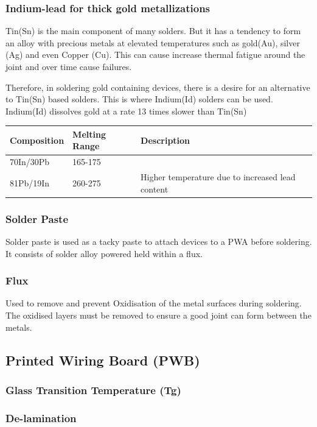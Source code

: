 \documentclass{article}
\begin{document}
		\subsubsection{Indium-lead for thick gold metallizations}
		Tin(Sn) is the main component of many solders.
		But it has a tendency to form an alloy with precious metals at elevated temperatures such as gold(Au), silver (Ag) and even Copper (Cu).
		This can cause increase thermal fatigue around the joint and over time cause failures.
		
		Therefore, in soldering gold containing devices, there is a desire for an alternative to Tin(Sn) based solders.
		This is where Indium(Id) solders can be used. Indium(Id) dissolves gold at a rate 13 times slower than Tin(Sn)
		
		\begin{center}
 			\begin{tabular}{| m{10em} | m{5em}| m{17em} |} 
 			\hline
 			\textbf{Composition} & \textbf{Melting Range} & \textbf{Description} \\ [0.5ex] 
 			\hline
 			 70In/30Pb & 165-175\degree &  \\ 
 			\hline
 			81Pb/19In & 260-275\degree & Higher temperature due to increased lead content \\ 
 			\hline
			\end{tabular}
		\end{center}	
		\subsubsection{Solder Paste}
		Solder paste is used as a tacky paste to attach devices to a PWA before soldering. 
		It consists of solder alloy powered held within a flux.
		\subsubsection{Flux}
		Used to remove and prevent Oxidisation of the metal surfaces during soldering. 
		The oxidised layers must be removed to ensure a good joint can form between the metals.
	\subsection{Printed Wiring Board (PWB)}
		\subsubsection{Glass Transition Temperature (Tg)}
		\subsubsection{De-lamination}
\end{document}
